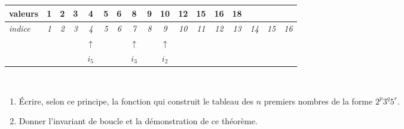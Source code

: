 \begin{tabular}{|l|c|c|c|c|c|c|c|c|c|c|c|c|c|c|c|c|}
 \hline
 valeurs&\bf 1&\bf 2&\bf 3&\bf 4&\bf 5&\bf 6&\bf 8&\bf 9&\bf 10&\bf
12&\bf 15&\bf 16&\bf 18&&&\\ \hline
 \it indice&\it 1&\it 2&\it 3&\it 4&\it 5&\it 6&\it
7&\it 8&\it 9&\it 10&\it 11&\it 12&\it 13&\it 14&\it 15&\it 16 \rm\\ 
 \hline
\multicolumn{1}{c}{} &\multicolumn{1}{c}{}
&\multicolumn{1}{c}{} &\multicolumn{1}{c}{}
&\multicolumn{1}{c}{$\uparrow$}&\multicolumn{1}{c}{}
&\multicolumn{1}{c}{} &\multicolumn{1}{c}{$\uparrow$}&\multicolumn{1}{c}{}
&\multicolumn{1}{c}{$\uparrow$}&\multicolumn{1}{c}{} &\multicolumn{1}{c}{}
&\multicolumn{1}{c}{} &\multicolumn{1}{c}{} &\multicolumn{1}{c}{}
&\multicolumn{1}{c}{} &\multicolumn{1}{c}{} \\
 \multicolumn{1}{c}{} &\multicolumn{1}{c}{} &\multicolumn{1}{c}{}
&\multicolumn{1}{c}{} &\multicolumn{1}{c}{$i_5$}&\multicolumn{1}{c}{}
&\multicolumn{1}{c}{} &\multicolumn{1}{c}{$i_3$}&\multicolumn{1}{c}{}
&\multicolumn{1}{c}{$i_2$}&\multicolumn{1}{c}{} &\multicolumn{1}{c}{}
&\multicolumn{1}{c}{} &\multicolumn{1}{c}{} &\multicolumn{1}{c}{}
&\multicolumn{1}{c}{} &\multicolumn{1}{c}{} 
 \end{tabular}
\\



\begin{enumerate}
\item Écrire, selon ce principe, la fonction qui construit le tableau des $n$
premiers nombres de la forme $2^p3^q5^r$.
\item Donner l'invariant de boucle et la démonstration de ce théorème.
\end{enumerate}